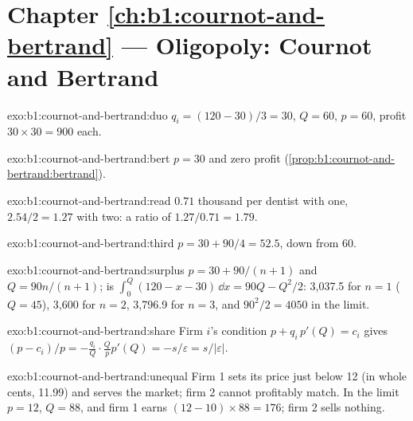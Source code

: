 \section*{Chapter \ref{ch:b1:cournot-and-bertrand} --- Oligopoly: Cournot and Bertrand}

\begin{solution}{exo:b1:cournot-and-bertrand:duo}
$q_i = (120 - 30)/3 = 30$, $Q = 60$, $p = 60$, profit $30 \times 30 = 900$ each.
\end{solution}

\begin{solution}{exo:b1:cournot-and-bertrand:bert}
$p = 30$ and zero profit (\cref{prop:b1:cournot-and-bertrand:bertrand}).
\end{solution}

\begin{solution}{exo:b1:cournot-and-bertrand:read}
$0.71$ thousand per dentist with one, $2.54/2 = 1.27$ with two: a ratio of
$1.27/0.71 = 1.79$.
\end{solution}

\begin{solution}{exo:b1:cournot-and-bertrand:third}
$p = 30 + 90/4 = 52.5$, down from 60.
\end{solution}

\begin{solution}{exo:b1:cournot-and-bertrand:surplus}
$p = 30 + 90/(n + 1)$ and $Q = 90n/(n + 1)$;  is
$\int_0^Q(120 - x - 30)\,\dd x = 90Q - Q^2/2$: 3,037.5 for $n = 1$ ($Q = 45$), 3,600 for $n = 2$,
3,796.9 for $n = 3$, and $90^2/2 = 4050$ in the limit.
\end{solution}

\begin{solution}{exo:b1:cournot-and-bertrand:share}
Firm $i$'s condition $p + q_i\,p'(Q) = c_i$ gives
$(p - c_i)/p = -\frac{q_i}{Q}\cdot\frac{Q}{p}p'(Q) = -s/\varepsilon = s/|\varepsilon|$.
\end{solution}

\begin{solution}{exo:b1:cournot-and-bertrand:unequal}
Firm 1 sets its price just below 12 (in whole cents, 11.99) and serves the
market; firm 2 cannot profitably match. In the limit $p = 12$, $Q = 88$, and firm
1 earns $(12 - 10) \times 88 = 176$; firm 2 sells nothing.
\end{solution}

